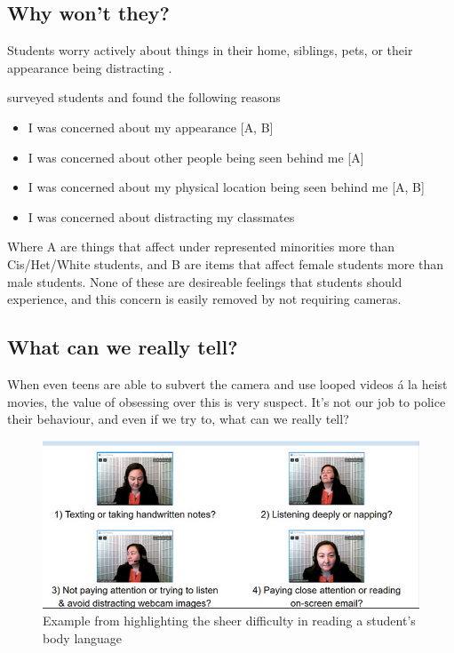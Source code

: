 \documentclass[paper=a4,justified,a4paper]{tufte-handout}
\providecommand{\tightlist}{%
  \setlength{\itemsep}{0pt}\setlength{\parskip}{0pt}}
\begin{document}
\hypertarget{why-wont-they}{%
\subsection{Why won't they?}\label{why-wont-they}}

Students worry actively about things in their home, siblings, pets, or
their appearance being distracting .

\citep{10.1002/ece3.7123} surveyed students and found the following
reasons

\begin{itemize}
\tightlist
\item
  I was concerned about my appearance {[}A, B{]}
\item
  I was concerned about other people being seen behind me {[}A{]}
\item
  I was concerned about my physical location being seen behind me {[}A,
  B{]}
\item
  I was concerned about distracting my classmates
\end{itemize}

Where A are things that affect under represented minorities more than
Cis/Het/White students, and B are items that affect female students more
than male students. None of these are desireable feelings that students
should experience, and this concern is easily removed by not requiring
cameras.

\hypertarget{what-can-we-really-tell}{%
\subsection{What can we really tell?}\label{what-can-we-really-tell}}

When even teens are able to subvert the camera \citep{vice} and use
looped videos á la heist movies, the value of obsessing over this is
very suspect. It's not our job to police their behaviour, and even if we
try to, what can we really tell?

\begin{figure}
\centering
\includegraphics{educase.jpg}
\caption{Example from \citep{educase} highlighting the sheer difficulty
in reading a student's body language}
\end{figure}
\end{document}
